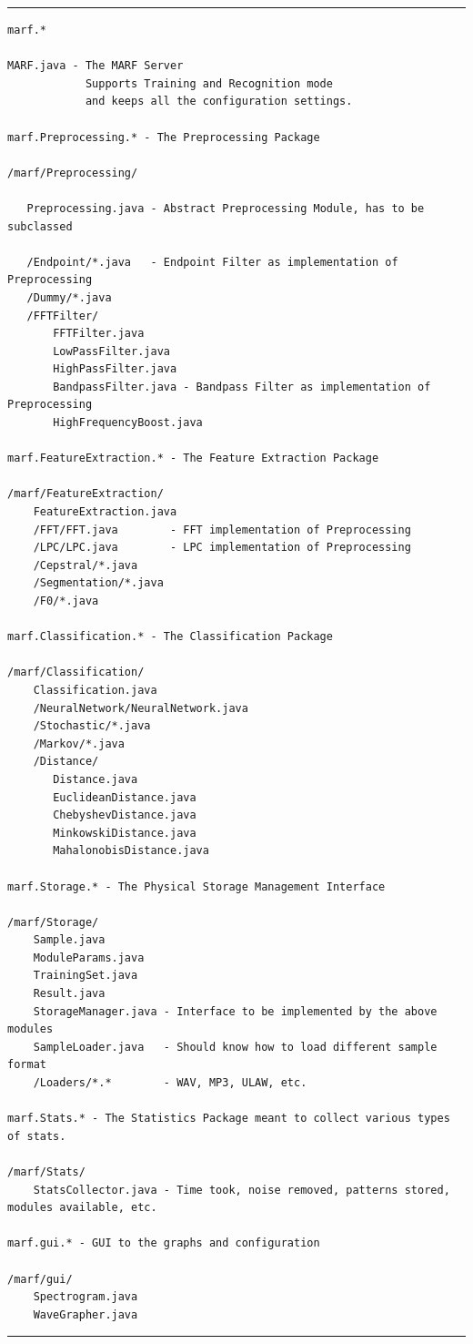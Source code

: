 \vspace{15pt}
\hrule
\begin{verbatim}
marf.*

MARF.java - The MARF Server
            Supports Training and Recognition mode
            and keeps all the configuration settings.

marf.Preprocessing.* - The Preprocessing Package

/marf/Preprocessing/

   Preprocessing.java - Abstract Preprocessing Module, has to be subclassed

   /Endpoint/*.java   - Endpoint Filter as implementation of Preprocessing
   /Dummy/*.java
   /FFTFilter/
       FFTFilter.java
       LowPassFilter.java
       HighPassFilter.java
       BandpassFilter.java - Bandpass Filter as implementation of Preprocessing
       HighFrequencyBoost.java

marf.FeatureExtraction.* - The Feature Extraction Package

/marf/FeatureExtraction/
    FeatureExtraction.java
    /FFT/FFT.java        - FFT implementation of Preprocessing
    /LPC/LPC.java        - LPC implementation of Preprocessing
    /Cepstral/*.java
    /Segmentation/*.java
    /F0/*.java

marf.Classification.* - The Classification Package

/marf/Classification/
    Classification.java
    /NeuralNetwork/NeuralNetwork.java
    /Stochastic/*.java
    /Markov/*.java
    /Distance/
       Distance.java
       EuclideanDistance.java
       ChebyshevDistance.java
       MinkowskiDistance.java
       MahalonobisDistance.java

marf.Storage.* - The Physical Storage Management Interface

/marf/Storage/
    Sample.java
    ModuleParams.java
    TrainingSet.java
    Result.java
    StorageManager.java - Interface to be implemented by the above modules
    SampleLoader.java   - Should know how to load different sample format
    /Loaders/*.*        - WAV, MP3, ULAW, etc.

marf.Stats.* - The Statistics Package meant to collect various types of stats.

/marf/Stats/
    StatsCollector.java - Time took, noise removed, patterns stored, modules available, etc.

marf.gui.* - GUI to the graphs and configuration

/marf/gui/
    Spectrogram.java
    WaveGrapher.java
\end{verbatim}
\hrule
\vspace{15pt}

